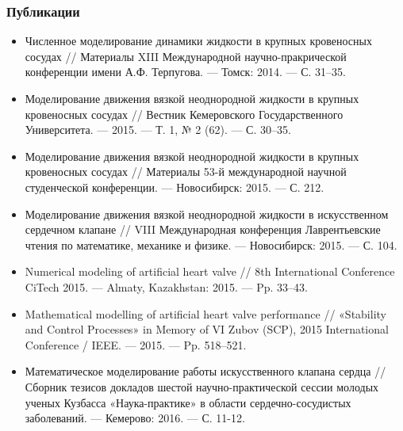 \documentclass[14pt]{beamer}
\begin{document}
\begin{frame}
\frametitle{Публикации}
    {\tiny
        \begin{itemize}
            \item[\MVRightarrow] Численное моделирование динамики жидкости в крупных кровеносных сосудах // Материалы XIII Международной научно-пракрической конференции имени А.Ф. Терпугова. — Томск: 2014. — С. 31–35.
            \item[\MVRightarrow] Моделирование движения вязкой неоднородной жидкости в крупных кровеносных сосудах // Вестник Кемеровского Государственного Университета. — 2015. — Т. 1, № 2 (62). — С. 30–35.
            \item[\MVRightarrow] Моделирование движения вязкой неоднородной жидкости в крупных кровеносных сосудах // Материалы 53-й международной научной студенческой конференции. — Новосибирск: 2015. — С. 212.
            \item[\MVRightarrow] Моделирование движения вязкой неоднородной жидкости в искусственном сердечном клапане // VIII Международная конференция Лаврентьевские чтения по математике, механике и физике. — Новосибирск: 2015. — С. 104.
            \item[\MVRightarrow] Numerical modeling of artificial heart valve // 8th International Conference CiTech 2015. — Almaty, Kazakhstan: 2015. — Pp. 33–43.
            \item[\MVRightarrow] Mathematical modelling of artificial heart valve performance // «Stability and Control Processes» in Memory of VI Zubov (SCP), 2015 International Conference / IEEE. — 2015. — Pp. 518–521.
            \item[\MVRightarrow] Математическое моделирование работы искусственного клапана сердца // Сборник тезисов докладов шестой научно-практической сессии молодых ученых Кузбасса «Наука-практике» в области сердечно-сосудистых заболеваний. — Кемерово: 2016. — С. 11-12.
        \end{itemize}
    }
\end{frame}
\end{document}
